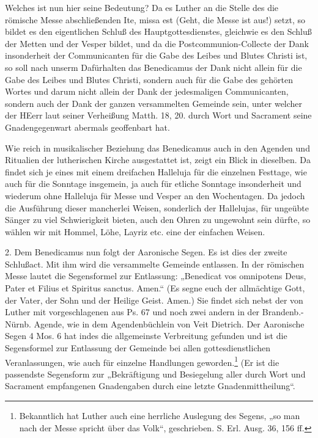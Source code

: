Welches ist nun hier seine Bedeutung? Da es Luther an die Stelle des die römische Messe abschließenden Ite, missa est (Geht, die Messe ist aus!) setzt, so bildet es den eigentlichen Schluß des Hauptgottesdienstes, gleichwie es den Schluß der Metten und der Vesper bildet, und da die Postcommunion-Collecte der Dank insonderheit der Communicanten für die Gabe des Leibes und Blutes Christi ist, so soll nach unserm Dafürhalten das Benedicamus der Dank nicht allein für die Gabe des Leibes und Blutes Christi, sondern auch für die Gabe des gehörten Wortes und darum nicht allein der Dank der
jedesmaligen Communicanten, sondern auch der Dank der ganzen versammelten Gemeinde sein, unter welcher der HEerr laut seiner Verheißung Matth. 18, 20. durch Wort und Sacrament seine Gnadengegenwart abermals geoffenbart hat.

Wie reich in musikalischer Beziehung das Benedicamus auch in den Agenden und Ritualien der lutherischen Kirche ausgestattet ist, zeigt ein Blick in dieselben. Da findet sich je eines mit einem dreifachen Halleluja für die einzelnen Festtage, wie auch für die Sonntage insgemein, ja auch für etliche Sonntage insonderheit und wiederum ohne Halleluja für Messe und Vesper an den Wochentagen. Da jedoch die Ausführung dieser mancherlei Weisen, sonderlich der Hallelujas, für ungeübte Sänger zu viel Schwierigkeit bieten, auch den Ohren zu ungewohnt sein dürfte, so wählen wir mit Hommel, Löhe, Layriz etc. eine der einfachen Weisen.

2. Dem Benedicamus nun folgt der Aaronische Segen. Es ist dies der zweite Schlußact. Mit ihm wird die versammelte Gemeinde entlassen. In der römischen Messe lautet die Segensformel zur Entlassung: „Benedicat vos omnipotens Deus, Pater et Filius et Spiritus sanctus. Amen.“ (Es segne euch der allmächtige Gott, der Vater, der Sohn und der Heilige Geist. Amen.) Sie findet sich nebst der von Luther mit vorgeschlagenen aus Ps. 67 und noch zwei andern in der Brandenb.-Nürnb. Agende, wie in dem Agendenbüchlein von Veit Dietrich. Der Aaronische Segen 4 Mos. 6 hat indes die allgemeinste Verbreitung gefunden und ist die Segensformel zur Entlassung der Gemeinde bei allen gottesdienstlichen Veranlassungen, wie auch für einzelne Handlungen geworden.\footnote{Bekanntlich hat Luther auch eine herrliche Auslegung des Segens, „so man nach der Messe spricht über das Volk“, geschrieben. S. Erl. Ausg. 36, 156 ff.} (Er ist die passendste Segensform zur „Bekräftigung und Besiegelung aller durch Wort und Sacrament empfangenen Gnadengaben durch eine letzte Gnadenmittheilung“.

